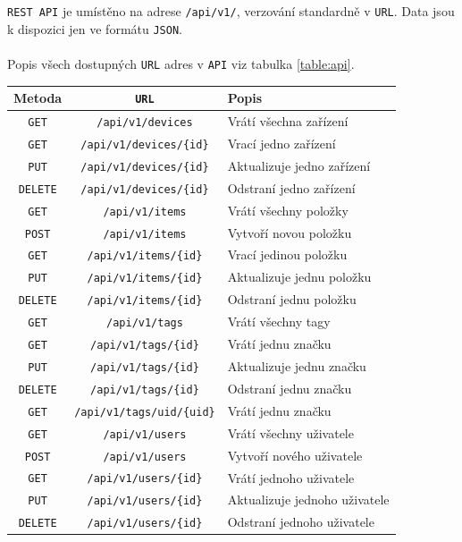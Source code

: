 \documentclass[czech,BP]{thesiskiv}
\begin{document}
		\texttt{REST API} je umístěno na adrese \texttt{/api/v1/}, verzování standardně v \texttt{URL}. Data jsou k dispozici jen ve formátu \texttt{JSON}. 
\\\\
Popis všech dostupných \texttt{URL} adres v \texttt{API} viz tabulka \ref{table:api}.
\begin{table}[H]
\centering
\begin{tabular}{ c | c | p{6cm}}
\textbf{Metoda} & \textbf{ \texttt{URL}} & \textbf{Popis} \\ \hline\hline
 	
\texttt{GET} & \texttt{/api/v1/devices} & Vrátí všechna zařízení \\ \hline  
\texttt{GET} & \texttt{/api/v1/devices/\{id\}} & Vrací jedno zařízení \\ \hline
\texttt{PUT} & \texttt{/api/v1/devices/\{id\}} & Aktualizuje jedno zařízení \\ \hline
\texttt{DELETE} & \texttt{/api/v1/devices/\{id\}} & Odstraní jedno zařízení  \\ \hline

\texttt{GET} & \texttt{/api/v1/items} & Vrátí všechny položky \\ \hline
\texttt{POST} & \texttt{/api/v1/items} & Vytvoří novou položku \\ \hline
\texttt{GET} & \texttt{/api/v1/items/\{id\}} & Vrací jedinou položku \\ \hline
\texttt{PUT} & \texttt{/api/v1/items/\{id\}} & Aktualizuje jednu položku \\ \hline
\texttt{DELETE} & \texttt{/api/v1/items/\{id\}} & Odstraní jednu položku \\ \hline

\texttt{GET} & \texttt{/api/v1/tags} & Vrátí všechny tagy  \\ \hline
\texttt{GET} & \texttt{/api/v1/tags/\{id\}} & Vrátí jednu značku \\ \hline
\texttt{PUT} & \texttt{/api/v1/tags/\{id\}} & Aktualizuje jednu značku \\ \hline
\texttt{DELETE} & \texttt{/api/v1/tags/\{id\}} & Odstraní jednu značku \\ \hline
\texttt{GET} & \texttt{/api/v1/tags/uid/\{uid\}} & Vrátí jednu značku \\ \hline

\texttt{GET} & \texttt{/api/v1/users} & Vrátí všechny uživatele \\ \hline
\texttt{POST} & \texttt{/api/v1/users} & Vytvoří nového uživatele \\ \hline
\texttt{GET} & \texttt{/api/v1/users/\{id\}} & Vrátí jednoho uživatele \\ \hline
\texttt{PUT} & \texttt{/api/v1/users/\{id\}} & Aktualizuje jednoho uživatele \\ \hline
\texttt{DELETE} & \texttt{/api/v1/users/\{id\}} & Odstraní jednoho uživatele \\ \hline


\end{tabular}
\end{table}
\end{document}
